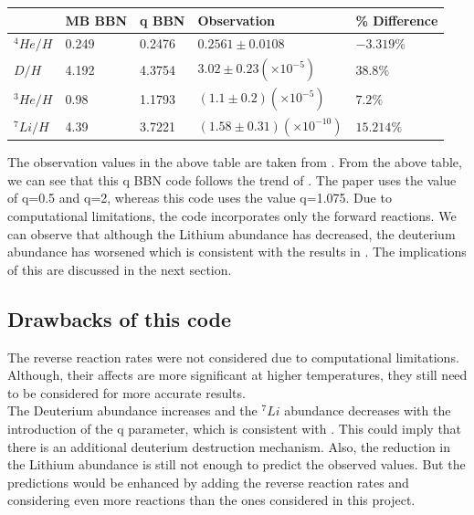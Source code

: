 \documentclass[11pt]{article}
\numberwithin{equation}{section}
\begin{document}
\begin{table}[!ht]
    \centering
    \begin{tabular}{|l|l|l|l|l|}
    \hline
        ~ & MB BBN 
        	& q BBN 
        & Observation 
        & \% Difference \\ \hline
        $^{4} He/H$ & 0.249 & 0.2476 & $0.2561 \pm 0.0108$ & $-3.319\%$ \\ \hline
        $D/H$       & 4.192 & 4.3754 & $3.02\pm 0.23(\times 10^{-5})$ & $38.8\%$ \\ \hline
        $^{3} He/H$ & 0.98 & 1.1793 & $ (1.1 \pm 0.2)(\times 10^{-5})$ & $7.2 \%$ \\ \hline
        $^{7} Li/H$ & 4.39 & 3.7221 & $ (1.58 \pm 0.31)(\times 10^{-10})$ & $15.214 \%$ \\ \hline
    \end{tabular}
\end{table}
The observation values in the above table are taken from \citep{Hou_2017}. From the above table, we can see that this q BBN code follows the trend of \cite{article}. The paper \cite{article} uses the value of q=0.5 and q=2, whereas this code uses the value q=1.075. Due to computational limitations, the code incorporates only the forward reactions. 
We can observe that although the Lithium abundance has decreased, the deuterium abundance has worsened which is consistent with the results in \cite{Kusakabe:2018dzx}. The implications of this are discussed in the next section.

\subsection{Drawbacks of this code}
The reverse reaction rates were not considered due to computational limitations. Although, their affects are more significant at higher temperatures, they still need to be considered for more accurate results.
\\
The Deuterium abundance increases and the $^{7}Li$ abundance decreases with the introduction of the q parameter, which is consistent with \citep{Kusakabe:2018dzx}. This could imply that there is an additional deuterium destruction mechanism. Also, the reduction in the Lithium abundance is still not enough to predict the observed values. But the predictions would be enhanced by adding the reverse reaction rates and considering even more reactions than the ones considered in this project.
\end{document}
